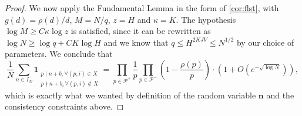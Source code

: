 \documentclass[11pt]{amsart}
\theoremstyle{definition}
\renewcommand{\leq}{\leqslant}
\renewcommand{\geq}{\geqslant}
\newcommand{\ind}[1]{\mathbf{1}_{#1}}
\newcommand{\N}{I_N}
\newcommand{\primes}{\mathcal{P}}
\newcommand{\n}{\mathbf{n}}
\newcommand{\curlyL}{V}
\newcommand{\sommespart}{b}
\newcommand{\repR}{J}
\newcommand{\repK}{K}
\newcommand{\Div}{X}
\begin{document}
\begin{proof}
We now apply the Fundamental Lemma in the form of \cref{cor:flst}, with ${g(d) = \rho(d)/d}$, ${M = {N}/{q}}$, $z=H$ and $\kappa = \repK$. The hypothesis $\log M \geq C\kappa \log z$ is satisfied, since it can be rewritten as ${\log N \geq \log q + C\repK \log H}$ and we know that $q \leq H^{2\repK\repR \curlyL} \leq N^{1/2}$ by our choice of parameters.
We conclude that
\begin{equation*}
\frac{1}{N} \sum_{n\in \N} \ind{\substack{p\mid n+\sommespart_i\, \forall (p, i)\in \Div \\ p\nmid n+\sommespart_i\, \forall (p, i)\notin \Div}} = \prod_{p\in \primes^{+}}\frac 1p \prod_{p\in \primes^{-}}\left(1-\frac{\rho(p)}{p}\right) \cdot \left(1+O\left(e^{-\sqrt{\log N}}\right)\right),
\end{equation*}
which is exactly what we wanted by definition of the random variable $\n$ and the consistency constraints above.
\end{proof}
\end{document}
